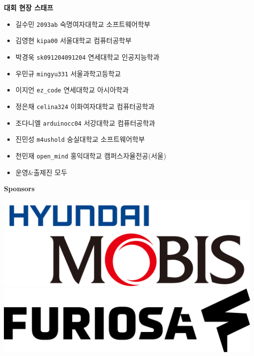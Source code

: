     \begin{frame}%
        \textbf{대회 현장 스태프} %
        \begin{itemize}
            \item 길수민 \tabto{1.5cm} \texttt{2093ab} \tabto{8cm} {\color{gray} 숙명여자대학교 소프트웨어학부}
            \item 김영현 \tabto{1.5cm} \texttt{kipa00} \tabto{8cm} {\color{gray} 서울대학교 컴퓨터공학부}
            \item 박경욱 \tabto{1.5cm} \texttt{sk091204091204} \tabto{8cm} {\color{gray} 연세대학교 인공지능학과}
            \item 우민규 \tabto{1.5cm} \texttt{mingyu331} \tabto{8cm} {\color{gray} 서울과학고등학교}
            \item 이지언 \tabto{1.5cm} \texttt{ez\_code} \tabto{8cm} {\color{gray} 연세대학교 아시아학과}
            \item 정은채 \tabto{1.5cm} \texttt{celina324} \tabto{8cm} {\color{gray} 이화여자대학교 컴퓨터공학과}
            \item 조다니엘 \tabto{1.5cm} \texttt{arduinocc04} \tabto{8cm} {\color{gray} 서강대학교 컴퓨터공학과}
            \item 진민성 \tabto{1.5cm} \texttt{m4ushold} \tabto{8cm} {\color{gray} 숭실대학교 소프트웨어학부}
            \item 천민재 \tabto{1.5cm} \texttt{open\_mind} \tabto{8cm} {\color{gray} 홍익대학교 캠퍼스자율전공(서울)}
            \item 운영\&출제진 모두
        \end{itemize}
    \end{frame}
    
    \begin{frame}{\textbf{Sponsors}}
        \begin{center}
            \includegraphics[width=0.36\linewidth]{images/logos/mobis.jpg}\\
            \vspace{10mm}
            \includegraphics[width=0.36\linewidth]{images/logos/Furiosa_AI.png}
        \end{center}
    \end{frame}

